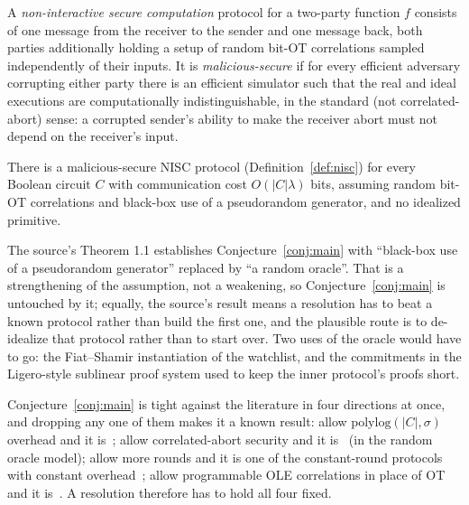 \documentclass{aicr-conjecture}
\begin{document}
\begin{definition}\label{def:nisc}
A \emph{non-interactive secure computation} protocol for a two-party
function $f$ consists of one message from the receiver to the sender and
one message back, both parties additionally holding a setup of random
bit-OT correlations sampled independently of their inputs. It is
\emph{malicious-secure} if for every efficient adversary corrupting
either party there is an efficient simulator such that the real and
ideal executions are computationally indistinguishable, in the standard
(not correlated-abort) sense: a corrupted sender's ability to make the
receiver abort must not depend on the receiver's input.
\end{definition}

\begin{conjecture}\label{conj:main}
There is a malicious-secure NISC protocol (Definition~\ref{def:nisc})
for every Boolean circuit $C$ with communication cost $O(|C|\lambda)$
bits, assuming random bit-OT correlations and black-box use of a
pseudorandom generator, and no idealized primitive.
\end{conjecture}

\begin{remark}\label{rem:ro}
The source's Theorem 1.1 establishes Conjecture~\ref{conj:main} with
``black-box use of a pseudorandom generator'' replaced by ``a random
oracle''. That is a strengthening of the assumption, not a weakening, so
Conjecture~\ref{conj:main} is untouched by it; equally, the source's
result means a resolution has to beat a known protocol rather than build
the first one, and the plausible route is to de-idealize that protocol
rather than to start over. Two uses of the oracle would have to go: the
Fiat--Shamir instantiation of the watchlist, and the commitments in the
Ligero-style sublinear proof system used to keep the inner protocol's
proofs short.
\end{remark}

\begin{remark}\label{rem:relaxations}
Conjecture~\ref{conj:main} is tight against the literature in four
directions at once, and dropping any one of them makes it a known
result: allow $\mathrm{polylog}(|C|,\sigma)$ overhead and it
is~\cite{IKO+11}; allow correlated-abort security and it
is~\cite{IKO+11,HIV17} (in the random oracle model); allow more rounds
and it is one of the constant-round protocols with constant
overhead~\cite{HIV17}; allow programmable OLE correlations in place of OT
and it is~\cite{DILO22}. A resolution therefore has to hold all four
fixed.
\end{remark}
\end{document}
